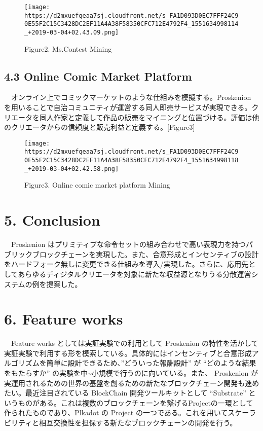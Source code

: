 \begin{figure}
\centering
\texttt{[image: https://d2mxuefqeaa7sj.cloudfront.net/s\_FA1D093D0EC7FFF24C90E55F2C15C3428DC2EF11A4A38F58350CFC712E4792F4\_1551634998114\_+2019-03-04+02.43.09.png]}
\caption{Figure2. Ms.Contest Mining}
\end{figure}

\hypertarget{online-comic-market-platform}{%
\section{4.3 Online Comic Market
Platform}\label{online-comic-market-platform}}

　オンライン上でコミックマーケットのような仕組みを模擬する。Proskenion
を用いることで自治コミュニティが運営する同人即売サービスが実現できる。クリエータを同人作家と定義して作品の販売をマイニングと位置づける。評価は他のクリエータからの信頼度と販売利益と定義する。{[}Figure3{]}

\begin{figure}
\centering
\texttt{[image: https://d2mxuefqeaa7sj.cloudfront.net/s\_FA1D093D0EC7FFF24C90E55F2C15C3428DC2EF11A4A38F58350CFC712E4792F4\_1551634998118\_+2019-03-04+02.42.58.png]}
\caption{Figure3. Online comic market platform Mining}
\end{figure}

\hypertarget{conclusion}{%
\chapter{5. Conclusion}\label{conclusion}}

　Proskenion
はプリミティブな命令セットの組み合わせで高い表現力を持つパブリックブロックチェーンを実現した。また、合意形成とインセンティブの設計をハードフォーク無しに変更できる仕組みを導入/実現した。さらに、応用先としてあらゆるディジタルクリエータを対象に新たな収益源となりうる分散運営システムの例を提案した。

\hypertarget{feature-works}{%
\chapter{6. Feature works}\label{feature-works}}

　Feature works としては実証実験での利用として Proskenion
の特性を活かして実証実験で利用する形を模索している。具体的にはインセンティブと合意形成アルゴリズムを簡単に設計できるため、''どういった報酬設計''
が ``どのような結果をもたらすか''
の実験を中\textasciitilde 小規模で行うのに向いている。また、 Proskenion
が実運用されるための世界の基盤を創るための新たなブロックチェーン開発も進めたい。最近注目されている
BlockChain 開発ツールキットとして ``Substrate''
というものがある。これは複数のブロックチェーンを繋げるProjectの一環として作られたものであり、Plkadot
の Project
の一つである。これを用いてスケーラビリティと相互交換性を担保する新たなブロックチェーンの開発を行う。

